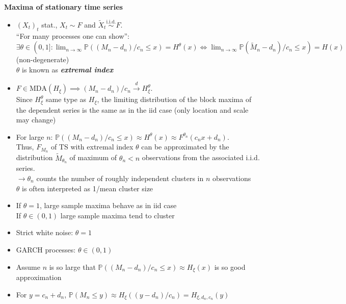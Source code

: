 \textbf{Maxima of stationary time series}
\begin{itemize}
    \item $(X_t)_t$ stat., $X_t\sim F$ and $\tilde X_t\stackrel{\text{i.i.d.}}{\sim} F$.\\
    ``For many processes one can show'':\\
    $\exists \theta\in(0,1]: \lim_{n\rightarrow\infty}
    \mathbb{P}((M_n-d_n)/c_n \leq x)=H^\theta (x)
    \iff \lim_{n\rightarrow\infty}\mathbb{P}(\tilde M_n-d_n)/c_n\leq x)=H(x)$ (non-degenerate)\\
    $\theta$ is known as \textbf{\textit{extremal index}}
    \item $F\in\text{MDA}(H_\xi)\implies(M_n-d_n)/c_n\stackrel{d}{\rightarrow} H^\theta_\xi$.\\
    Since $H^\theta_\xi$ same type as $H_\xi$, the limiting distribution of the block maxima of the dependent series is the same as in the iid case (only location and scale may change)
    \item For large $n$: $\mathbb{P}((M_n-d_n)/c_n\leq x)\approx H^\theta (x)\approx F^{\theta_n}(c_nx+d_n)$.\\
    Thus, $F_{M_n}$ of TS with extremal index $\theta$ can be approximated by the distribution $\tilde M_{\theta_n}$ of maximum of $\theta_n<n$ observations from the associated i.i.d. series.\\
    $\rightarrow \theta_n$ counts the number of roughly independent clusters in $n$ observations\\
    $\theta$ is often interpreted as 1/mean cluster size
    \item If $\theta=1$, large sample maxima behave as in iid case\\
    If $\theta\in(0,1)$ large sample maxima tend to cluster
    \item Strict white noise: $\theta=1$
    \item GARCH processes: $\theta\in(0,1)$
    \item Assume $n$ is so large that $\mathbb{P}((M_n-d_n)/c_n\leq x)\approx H_\xi(x)$ is so good approximation
    \item For $y=c_n+d_n$, $\mathbb{P}(M_n\leq y)\approx H_\xi((y-d_n)/c_n)=H_{\xi,d_n,c_n}(y)$
\end{itemize}


